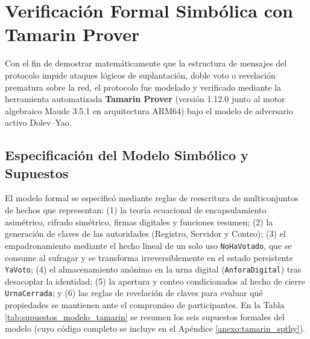 \section{Verificación Formal Simbólica con Tamarin Prover}
\label{sec:practica_tamarin}

Con el fin de demostrar matemáticamente que la estructura de mensajes del protocolo impide ataques lógicos de suplantación, doble voto o revelación prematura sobre la red, el protocolo fue modelado y verificado mediante la herramienta automatizada \textbf{Tamarin Prover} (versión 1.12.0 junto al motor algebraico Maude 3.5.1 en arquitectura ARM64) bajo el modelo de adversario activo Dolev--Yao.

\subsection{Especificación del Modelo Simbólico y Supuestos}
\label{subsec:tamarin_modelo_formal}

El modelo formal se especificó mediante reglas de reescritura de multiconjuntos de hechos que representan: (1) la teoría ecuacional de encapsulamiento asimétrico, cifrado simétrico, firmas digitales y funciones resumen; (2) la generación de claves de las autoridades (Registro, Servidor y Conteo); (3) el empadronamiento mediante el hecho lineal de un solo uso \texttt{NoHaVotado}, que se consume al sufragar y se transforma irreversiblemente en el estado persistente \texttt{YaVoto}; (4) el almacenamiento anónimo en la urna digital (\texttt{AnforaDigital}) tras desacoplar la identidad; (5) la apertura y conteo condicionados al hecho de cierre \texttt{UrnaCerrada}; y (6) las reglas de revelación de claves para evaluar qué propiedades se mantienen ante el compromiso de participantes. En la Tabla \ref{tab:supuestos_modelo_tamarin} se resumen los seis supuestos formales del modelo (cuyo código completo se incluye en el Apéndice \ref{anexo:tamarin_spthy}).

